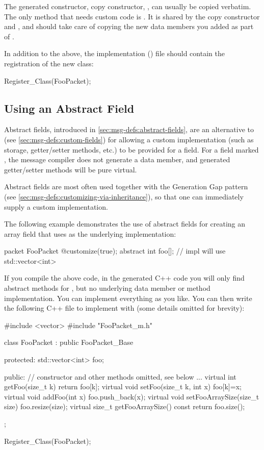 The generated constructor, copy constructor, ,  can
usually be copied verbatim. The only method that needs custom code is
. It is shared by the copy constructor and , and
should take care of copying the new data members you added as part of
.

In addition to the above, the implementation () file should contain the
registration of the new class:

\begin{cpp}
Register_Class(FooPacket);
\end{cpp}


\subsection{Using an Abstract Field}
\label{sec:msg-defs:customizing-via-abstact-field}

Abstract fields, introduced in \ref{sec:msg-defs:abstract-fields}, are an
alternative to  (see \ref{sec:msg-defs:custom-fields}) for
allowing a custom implementation (such as storage, getter/setter methods, etc.)
to be provided for a field. For a field marked , the message
compiler does not generate a data member, and generated getter/setter methods
will be pure virtual.

Abstract fields are most often used together with the Generation Gap pattern
(see \ref{sec:msg-defs:customizing-via-inheritance}), so that one can
immediately supply a custom implementation.

The following example demonstrates the use of abstract fields for creating
an array field that uses  as the underlying implementation:

\begin{msg}
packet FooPacket
{
    @customize(true);
    abstract int foo[]; // impl will use std::vector<int>
}
\end{msg}

If you compile the above code, in the generated C++ code you will only find
abstract methods for , but no underlying data member or method
implementation. You can implement everything as you like. You can then write the
following C++ file to implement  with  (some
details omitted for brevity):

\begin{cpp}
#include <vector>
#include "FooPacket_m.h"

class FooPacket : public FooPacket_Base
{
  protected:
    std::vector<int> foo;

  public:
    // constructor and other methods omitted, see below
    ...
    virtual int getFoo(size_t k) {return foo[k];}
    virtual void setFoo(size_t k, int x) {foo[k]=x;}
    virtual void addFoo(int x) {foo.push_back(x);}
    virtual void setFooArraySize(size_t size) {foo.resize(size);}
    virtual size_t getFooArraySize() const {return foo.size();}
};

Register_Class(FooPacket);
\end{cpp}

